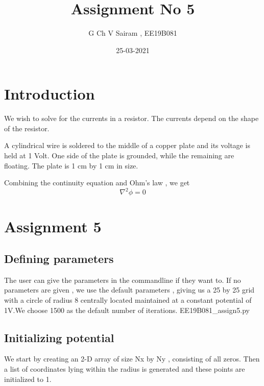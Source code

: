 \documentclass[11pt, a4paper]{article}
\title{Assignment No 5}
\author{G Ch V Sairam , EE19B081}
\date{25-03-2021}
\begin{document}
		
		
\maketitle
\section*{Introduction}

We wish to solve for the currents in a resistor. The currents depend on the shape of the resistor.

A cylindrical wire is soldered to the middle of a copper plate and its voltage
is held at 1 Volt. One side of the plate is grounded, while the remaining are
floating. The plate is 1 cm by 1 cm in size.

Combining the continuity equation and Ohm's law , we get
\begin{equation*}
 \nabla^2 \phi= 0
\end{equation*}

\section*{Assignment 5}
\subsection*{Defining parameters}
The user can give the parameters in the commandline if they want to. If no parameters are given , we use the default parameters , giving us a 25 by 25 grid with a circle of radius 8 centrally located maintained at a constant potential of 1V.We choose 1500 as the default number of iterations.
 {EE19B081_assign5.py}

\subsection*{Initializing potential}
We start by creating an  2-D array of size Nx by Ny , consisting of all zeros. Then a list of coordinates lying within the radius is generated and these points are initialized to 1.

\end{document}
